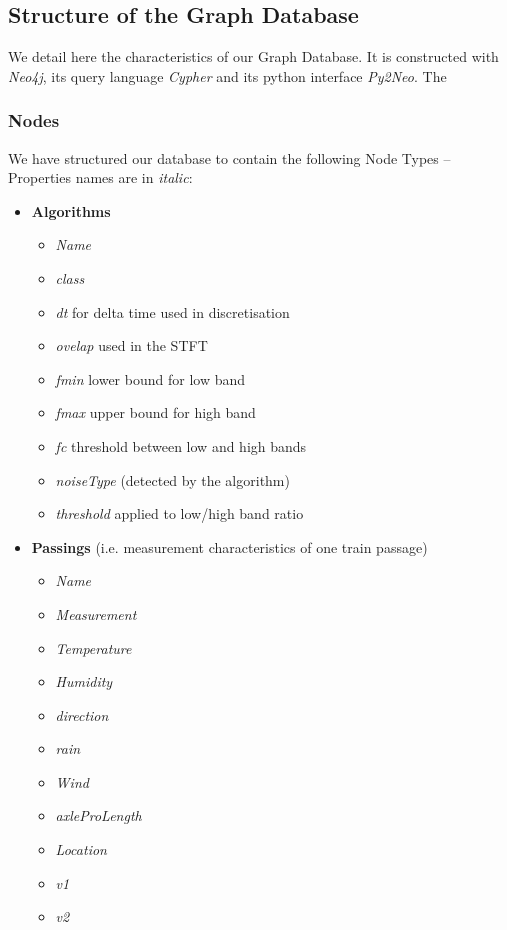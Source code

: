 \documentclass{article}\usepackage[]{graphicx}\usepackage[]{color}
\begin{document}
\subsection{\label{ssec:app:neo4jstruct}Structure of the Graph Database}
We detail here the characteristics of our Graph Database. It is constructed with {\it Neo4j}, its query language {\it Cypher} and its python interface {\it Py2Neo}. The 

\subsubsection{Nodes}
We have structured our database to contain the following Node Types -- Properties names are in {\it italic}:

\begin{itemize}
\item {\bf Algorithms}
  \begin{itemize}
    \item {\it Name}
    \item {\it class}
    \item {\it dt} for delta time used in discretisation
    \item {\it ovelap} used in the STFT
    \item {\it fmin} lower bound for low band
    \item {\it fmax} upper bound for high band
    \item {\it fc} threshold between low and high bands
    \item {\it noiseType} (detected by the algorithm)
    \item {\it threshold} applied to low/high band ratio
  \end{itemize}
\item {\bf Passings} (i.e. measurement characteristics of one train passage)
  \begin{itemize}
    \item {\it Name}
    \item {\it Measurement}
    \item {\it Temperature}
    \item {\it Humidity}
    \item {\it direction}
    \item {\it rain}
    \item {\it Wind}
    \item {\it axleProLength}
    \item {\it Location}
    \item {\it v1}
    \item {\it v2}

\end{itemize}
\end{itemize}
\end{document}
